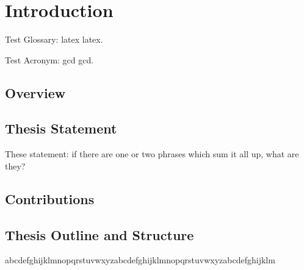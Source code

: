 \chapter{Introduction}

Test Glossary: \Gls{latex} \gls{latex}.

Test Acronym: \acrlong{gcd} \acrshort{gcd}.

\section{Overview}

\section{Thesis Statement}

These statement: if there are one or two phrases which sum it all up, what are they?

\section{Contributions}

\section{Thesis Outline and Structure}

abcdefghijklmnopqrstuvwxyzabcdefghijklmnopqrstuvwxyzabcdefghijklm